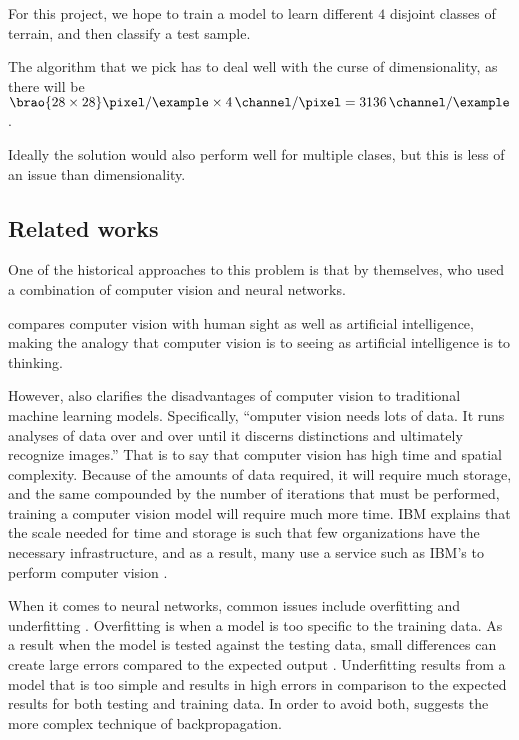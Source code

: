\documentclass[11pt]{report}
\DeclarePairedDelimiter\brao()%
\begin{document}
For this project, we hope to train a model to learn different \(4\) disjoint classes of terrain, and then classify a test sample.

The algorithm that we pick has to deal well with the curse of dimensionality,
as there will be
\(
    \SI[parse-numbers=false]{\brao{28\times28}\!}{\pixel\per\example}
    \times \SI4{\channel\per\pixel}
    = \SI{3136}{\channel\per\example}
\).

Ideally the solution would also perform well for multiple clases,
but this is less of an issue than dimensionality.

\subsection{Related works}

One of the historical approaches to this problem is that by \textcite{Basu2015a} themselves,
who
used a combination of computer vision and neural networks.

\textcite{IBM2020a} compares computer vision with human sight as well as artificial intelligence,
making the analogy that computer vision is to seeing as artificial intelligence is to thinking.

However, \textcite{IBM2020a} also clarifies the disadvantages of computer vision to traditional machine learning models.
Specifically, ``omputer vision needs lots of data. It runs analyses of data over and over until it discerns distinctions and ultimately recognize images.''
That is to say that computer vision has high time and spatial complexity.
Because of the amounts of data required,
it will require much storage,
and the same compounded by the number of iterations that must be performed,
training a computer vision model will require much more time.
IBM explains that the scale needed for time and storage is such that few organizations have the necessary infrastructure,
and as a result, many use a service such as IBM's to perform computer vision \cite{IBM2020a}.

When it comes to neural networks,
common issues include overfitting and underfitting%
\cite{Vignesh2020a}\cite{Lawrence2005a}.
Overfitting is when a model is too specific to the training data.
As a result when the model is tested against the testing data,
small differences can create large errors compared to the expected output%
\cite{Gao2022a}.
Underfitting results from a model that is too simple
and results in high errors in comparison to the expected results
for both testing and training data\cite{Vignesh2020a}.
In order to avoid both, \textcite{Lawrence2005a} suggests the more complex technique of backpropagation.
\end{document}
